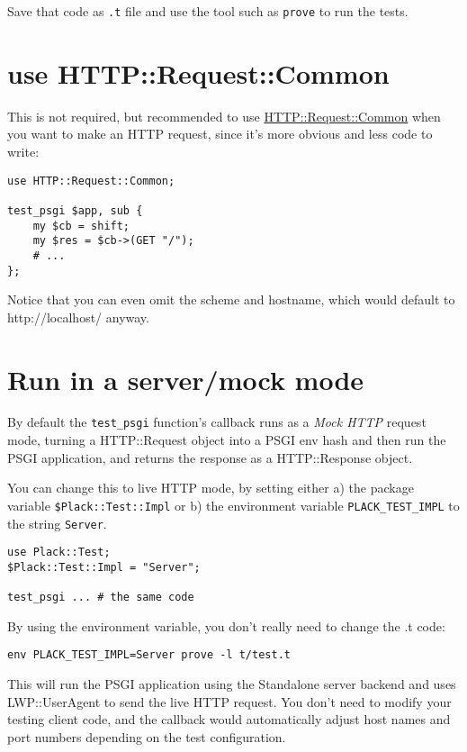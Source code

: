 Save that code as \lstinline!.t! file and use the tool such as
\lstinline!prove! to run the tests.

\section{use HTTP::Request::Common}\label{use-httprequestcommon}

This is not required, but recommended to use
\href{http://search.cpan.org/perldoc?HTTP::Request::Common}{HTTP::Request::Common}
when you want to make an HTTP request, since it's more obvious and less
code to write:

\begin{lstlisting}
use HTTP::Request::Common;

test_psgi $app, sub {
    my $cb = shift;
    my $res = $cb->(GET "/");
    # ...
};
\end{lstlisting}

Notice that you can even omit the scheme and hostname, which would
default to http://localhost/ anyway.

\section{Run in a server/mock mode}\label{run-in-a-servermock-mode}

By default the \lstinline!test_psgi! function's callback runs as a
\emph{Mock HTTP} request mode, turning a HTTP::Request object into a
PSGI env hash and then run the PSGI application, and returns the
response as a HTTP::Response object.

You can change this to live HTTP mode, by setting either a) the package
variable \lstinline!$Plack::Test::Impl! or b) the environment variable
\lstinline!PLACK_TEST_IMPL! to the string \lstinline!Server!.

\begin{lstlisting}
use Plack::Test;
$Plack::Test::Impl = "Server";

test_psgi ... # the same code
\end{lstlisting}

By using the environment variable, you don't really need to change the
.t code:

\begin{lstlisting}
env PLACK_TEST_IMPL=Server prove -l t/test.t
\end{lstlisting}

This will run the PSGI application using the Standalone server backend
and uses LWP::UserAgent to send the live HTTP request. You don't need to
modify your testing client code, and the callback would automatically
adjust host names and port numbers depending on the test configuration.

